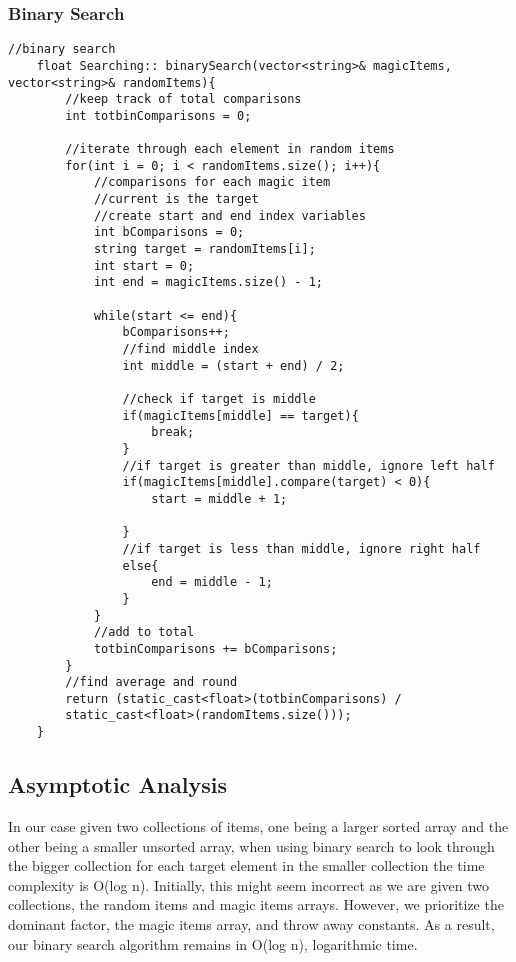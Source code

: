 \documentclass[letterpaper, 10pt,DIV=13]{scrartcl}
\numberwithin{equation}{section} %
\numberwithin{figure}{section} %
\numberwithin{table}{section} %
\begin{document}
\subsubsection*{Binary Search}
    \lstset{numbers=left, numberstyle=\tiny, stepnumber=1, numbersep=5pt, basicstyle=\footnotesize\ttfamily}
    \begin{lstlisting}[frame=single, ]
    //binary search
    float Searching:: binarySearch(vector<string>& magicItems, vector<string>& randomItems){
        //keep track of total comparisons
        int totbinComparisons = 0;
        
        //iterate through each element in random items
        for(int i = 0; i < randomItems.size(); i++){
            //comparisons for each magic item
            //current is the target
            //create start and end index variables
            int bComparisons = 0;
            string target = randomItems[i];
            int start = 0;
            int end = magicItems.size() - 1;
    
            while(start <= end){
                bComparisons++;
                //find middle index
                int middle = (start + end) / 2;
    
                //check if target is middle
                if(magicItems[middle] == target){
                    break;
                }
                //if target is greater than middle, ignore left half
                if(magicItems[middle].compare(target) < 0){
                    start = middle + 1;
    
                }
                //if target is less than middle, ignore right half
                else{
                    end = middle - 1;
                }
            }
            //add to total
            totbinComparisons += bComparisons;
        }
        //find average and round
        return (static_cast<float>(totbinComparisons) / 
        static_cast<float>(randomItems.size()));
    }

\end{lstlisting}

\subsection{Asymptotic Analysis}
In our case given two collections of items, one being a larger sorted array and the other being a smaller unsorted array, when using binary search to look through the bigger collection for each target element in the smaller collection the time complexity is O(log n). Initially, this might seem incorrect as we are given two collections, the random items and magic items arrays. However, we prioritize the dominant factor, the magic items array, and throw away constants. As a result, our binary search algorithm remains in O(log n), logarithmic time. 
\end{document}
